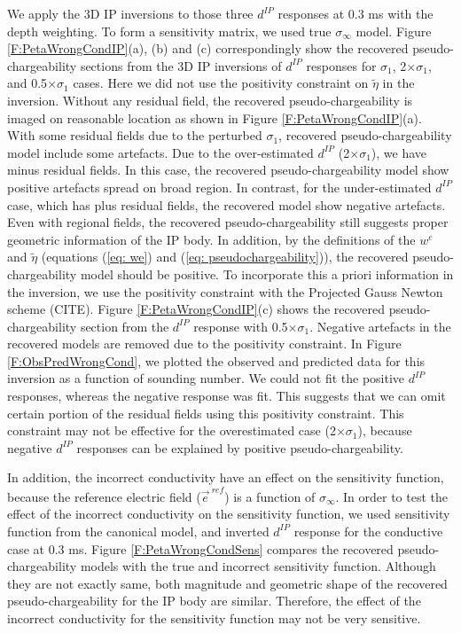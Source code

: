 \documentclass[a4paper, 11pt]{article}
\newcommand{\siginf}{\sigma_\infty}
\newcommand {\e}  { {\vec e} }
\newcommand{\peta}{\tilde{\eta}}
\newcommand{\dip}{d^{IP}}
\begin{document}
We apply the 3D IP inversions to those three $\dip$ responses at 0.3 ms with the depth weighting. To form a sensitivity matrix, we used true $\siginf$ model.  Figure \ref{F:PetaWrongCondIP}(a), (b) and (c) correspondingly show the recovered pseudo-chargeability sections from the 3D IP inversions of $\dip$ responses for $\sigma_1$, 2$\times \sigma_1$, and 0.5$\times \sigma_1$ cases. Here we did not use the positivity constraint on $\peta$ in the inversion. Without any residual field, the recovered pseudo-chargeability is imaged on reasonable location as shown in Figure \ref{F:PetaWrongCondIP}(a). With some residual fields due to the perturbed $\sigma_1$, recovered pseudo-chargeability model include some artefacts. Due to the over-estimated $\dip$ (2$\times \sigma_1$), we have minus residual fields. In this case, the recovered pseudo-chargeability model show positive artefacts spread on broad region. In contrast, for the under-estimated $\dip$ case, which has plus residual fields, the recovered model show negative artefacts. Even with regional fields, the recovered pseudo-chargeability still suggests proper geometric information of the IP body. In addition, by the definitions of the $w^e$ and $\peta$  (equations (\ref{eq: we}) and (\ref{eq: pseudochargeability})), the recovered pseudo-chargeability model should be positive. To incorporate this a priori information in  the inversion, we use the positivity constraint with the Projected Gauss Newton scheme (CITE). Figure \ref{F:PetaWrongCondIP}(c) shows the recovered pseudo-chargeability section from the $\dip$ response with 0.5$\times \sigma_1$. Negative artefacts in the recovered models are removed due to the positivity constraint. In Figure \ref{F:ObsPredWrongCond}, we plotted the observed and predicted data for this inversion as a function of sounding number. We could not fit the positive $\dip$ responses, whereas the negative response was fit. This suggests that we can omit certain portion of the residual fields using this positivity constraint. This constraint may not be effective for the overestimated case (2$\times \sigma_1$), because negative $\dip$ responses can be explained by positive pseudo-chargeability. 

In addition, the incorrect conductivity have an effect on the sensitivity function, because the reference electric field ($\e^{\ ref}$) is a function of $\siginf$. In order to test the effect of the incorrect conductivity on the sensitivity function, we used sensitivity function from the canonical model, and inverted $\dip$ response for the conductive case at 0.3 ms. Figure \ref{F:PetaWrongCondSens} compares the recovered pseudo-chargeability models with the true and incorrect sensitivity function. Although they are not exactly same, both magnitude and geometric shape of the recovered pseudo-chargeability for the IP body are similar. Therefore, the effect of the incorrect conductivity for the sensitivity function may not be very sensitive. 
\end{document}
